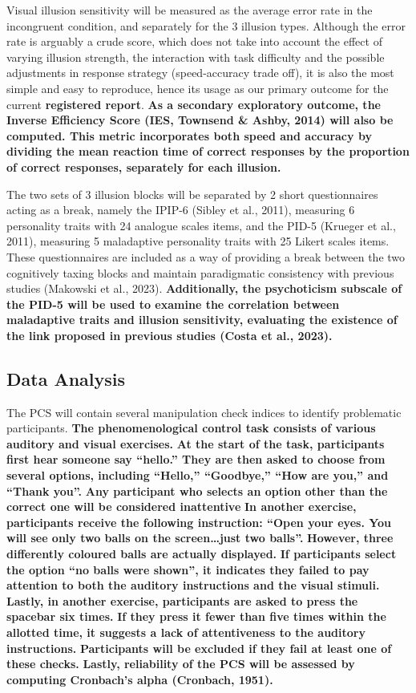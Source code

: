 \documentclass[
  man,
  floatsintext,
  longtable,
  nolmodern,
  notxfonts,
  notimes,
  colorlinks=true,linkcolor=blue,citecolor=blue,urlcolor=blue]{apa7}
\begin{document}
Visual illusion sensitivity will be measured as the average error rate
in the incongruent condition, and separately for the 3 illusion types.
Although the error rate is arguably a crude score, which does not take
into account the effect of varying illusion strength, the interaction
with task difficulty and the possible adjustments in response strategy
(speed-accuracy trade off), it is also the most simple and easy to
reproduce, hence its usage as our primary outcome for the current
\textbf{registered report}. \textbf{As a secondary exploratory outcome,
the Inverse Efficiency Score (IES, Townsend \& Ashby, 2014) will also be
computed. This metric incorporates both speed and accuracy by dividing
the mean reaction time of correct responses by the proportion of correct
responses, separately for each illusion.}

The two sets of 3 illusion blocks will be separated by 2 short
questionnaires acting as a break, namely the IPIP-6 (Sibley et al.,
2011), measuring 6 personality traits with 24 analogue scales items, and
the PID-5 (Krueger et al., 2011), measuring 5 maladaptive personality
traits with 25 Likert scales items. These questionnaires are included as
a way of providing a break between the two cognitively taxing blocks and
maintain paradigmatic consistency with previous studies (Makowski et
al., 2023). \textbf{Additionally, the psychoticism subscale of the PID-5
will be used to examine the correlation between maladaptive traits and
illusion sensitivity, evaluating the existence of the link proposed in
previous studies (Costa et al., 2023).}

\subsection{Data Analysis}\label{data-analysis}

The PCS will contain several manipulation check indices to identify
problematic participants. \textbf{The phenomenological control task
consists of various auditory and visual exercises.} \textbf{At the start
of the task, participants first hear someone say ``hello.'' They are
then asked to choose from several options, including ``Hello,''
``Goodbye,'' ``How are you,'' and ``Thank you''.} \textbf{Any
participant who selects an option other than the correct one will be
considered inattentive} \textbf{In another exercise, participants
receive the following instruction: ``Open your eyes. You will see only
two balls on the screen\ldots just two balls''.} \textbf{However, three
differently coloured balls are actually displayed.} \textbf{If
participants select the option ``no balls were shown'', it indicates
they failed to pay attention to both the auditory instructions and the
visual stimuli.} \textbf{Lastly, in another exercise, participants are
asked to press the spacebar six times.} \textbf{If they press it fewer
than five times within the allotted time, it suggests a lack of
attentiveness to the auditory instructions.} \textbf{Participants will
be excluded if they fail at least one of these checks.} \textbf{Lastly,
reliability of the PCS will be assessed by computing Cronbach's alpha
(Cronbach, 1951).}
\end{document}
